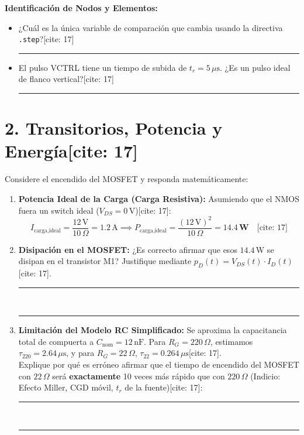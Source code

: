 \documentclass[11pt, a4paper]{article}
\begin{document}
\vspace{0.3cm}
\textbf{Identificación de Nodos y Elementos:}
\begin{itemize}
    \item ¿Cuál es la única variable de comparación que cambia usando la directiva \texttt{.step}?[cite: 17] \\
    \rule{0.6\linewidth}{0.15mm}
    \item El pulso VCTRL tiene un tiempo de subida de $t_r = 5\,\mu\text{s}$. ¿Es un pulso ideal de flanco vertical?[cite: 17] \\
    \rule{0.6\linewidth}{0.15mm}
\end{itemize}

\vspace{0.3cm}
\section*{2. Transitorios, Potencia y Energía[cite: 17]}
Considere el encendido del MOSFET y responda matemáticamente:
\begin{enumerate}
    \item \textbf{Potencia Ideal de la Carga (Carga Resistiva):} Asumiendo que el NMOS fuera un switch ideal ($V_{DS} = 0\,\text{V}$)[cite: 17]:
    \begin{equation*}
        I_{\text{carga,ideal}} = \frac{12\,\text{V}}{10\,\Omega} = 1.2\,\text{A} \implies P_{\text{carga,ideal}} = \frac{(12\,\text{V})^2}{10\,\Omega} = \mathbf{14.4\,\text{W}} \quad \text{[cite: 17]}
    \end{equation*}
    
    \item \textbf{Disipación en el MOSFET:} ¿Es correcto afirmar que esos $14.4\,\text{W}$ se disipan en el transistor M1? Justifique mediante $p_D(t) = V_{DS}(t) \cdot I_D(t)$[cite: 17]. \\
    \rule{\linewidth}{0.15mm} \\[0.2cm]
    \rule{\linewidth}{0.15mm}
    
    \item \textbf{Limitación del Modelo RC Simplificado:} Se aproxima la capacitancia total de compuerta a $C_{\text{nom}} = 12\,\text{nF}$. Para $R_G = 220\,\Omega$, estimamos $\tau_{220} = 2.64\,\mu\text{s}$, y para $R_G = 22\,\Omega$, $\tau_{22} = 0.264\,\mu\text{s}$[cite: 17]. \\
    Explique por qué es erróneo afirmar que el tiempo de encendido del MOSFET con $22\,\Omega$ será \textbf{exactamente} 10 veces más rápido que con $220\,\Omega$ (Indicio: Efecto Miller, CGD móvil, $t_r$ de la fuente)[cite: 17]: \\
    \rule{\linewidth}{0.15mm} \\[0.2cm]
    \rule{\linewidth}{0.15mm}
\end{enumerate}
\end{document}
